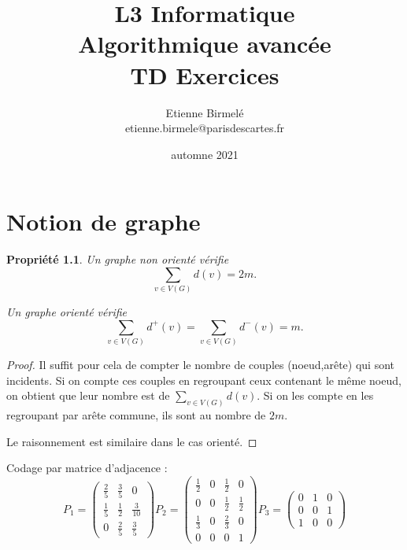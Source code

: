 \documentclass[10pt]{book}
\title{L3 Informatique  \\ \vspace{2cm}  Algorithmique avancée\\  TD Exercices \\ {\vspace2cm}  }
\date{automne 2021}
\author{Etienne Birmel\'e \\ etienne.birmele@parisdescartes.fr
}
\theoremstyle{plain}
\newtheorem{prop}{Propri\'et\'e}[chapter]
\theoremstyle{definition}
\begin{document}
\maketitle


\chapter{Notion de graphe}


\begin{prop}
Un graphe non orienté vérifie $$ \sum_{v\in V(G)} d(v) = 2m. $$

Un graphe orienté vérifie $$ \sum_{v\in V(G)} d^+(v) = \sum_{v\in V(G)} d^-(v) = m. $$
\end{prop}

\begin{proof}
Il suffit pour cela de compter le nombre de couples (noeud,arête) qui sont incidents. Si on compte ces couples en regroupant ceux contenant le même noeud, on obtient que leur nombre est de $ \sum_{v\in V(G)} d(v)$. Si on les compte en les regroupant par arête commune, ils sont au nombre de $2m$.

Le raisonnement est similaire dans le cas orienté.
\end{proof}

Codage par matrice d'adjacence : 
\[ P_1 = \begin{pmatrix} \frac{2}{5} & \frac{3}{5} & 0\\
                         \frac{1}{5} & \frac{1}{2} & \frac{3}{10} \\
                         0 & \frac{2}{5} & \frac{3}{5}     \end{pmatrix}
P_2 = \begin{pmatrix} \frac{1}{2} & 0 & \frac{1}{2} & 0\\
                      0 & 0 & \frac{1}{2} & \frac{1}{2}\\ 
                      \frac{1}{3} & 0 & \frac{2}{3} & 0 \\
                      0 & 0 & 0 & 1     \end{pmatrix}
P_3 = \begin{pmatrix} 0 & 1 & 0\\
                        0 & 0 & 1 \\
                        1 & 0 & 0     \end{pmatrix}  \]




\end{document}
